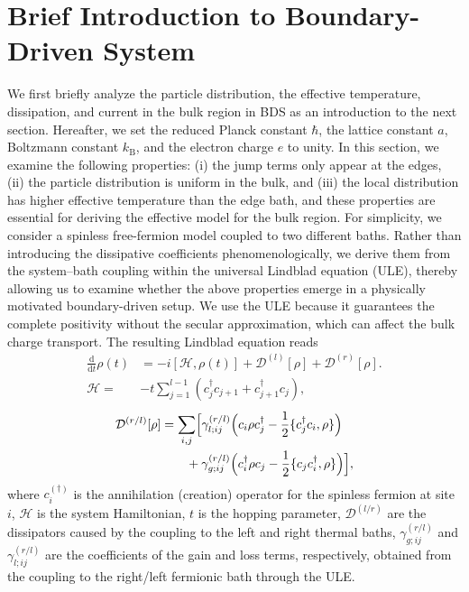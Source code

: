 \documentclass[a4paper, amsfonts, amssymb, amsmath, reprint, showkeys, nofootinbib, twoside,superscriptaddress, prb]{revtex4-2}
\newcommand{\m}[1]{\mathcal{#1}}
\newcommand{\dt}{\frac{\mathrm{d}}{\mathrm{d}t}}
\begin{document}
\section{Brief Introduction to Boundary-Driven System}
We first briefly analyze the particle distribution, the effective temperature, dissipation, and current in the bulk region in BDS as an introduction to the next section. Hereafter, we set the reduced Planck constant $\hbar$, the lattice constant $a$, Boltzmann constant $k_\mathrm{B}$, and the electron charge $e$ to unity. In this section, we examine the following properties: (i) the jump terms only appear at the edges, (ii) the particle distribution is uniform in the bulk, and (iii) the local distribution has higher effective temperature than the edge bath, and these properties are essential for deriving the effective model for the bulk region. 
For simplicity, we consider a spinless free-fermion model coupled to two different baths.
Rather than introducing the dissipative coefficients phenomenologically, we derive them from the system--bath coupling within the universal Lindblad equation (ULE)\cite{Nathan2020-mj,Davidovic2022-zp,Nathan2024-ag,Ikeuchi2025-wd}, thereby allowing us to examine whether the above properties emerge in a physically motivated boundary-driven setup.
We use the ULE because it guarantees the complete positivity without the secular approximation, which can affect the bulk charge transport\cite{Wichterich2007-mg, Landi2022-gk}. The resulting Lindblad equation reads
\begin{align}
    \dt \rho(t) &= -i[\m{H},\rho(t)] + \m{D}^{(l)}[\rho] + \m{D}^{(r)}[\rho].\label{NR}\\
    \m{H} =& -t\sum_{j=1}^{l-1} (c_j^{\dagger} c_{j+1} + c_{j+1}^{\dagger} c_j),\label{Ham_boundary}
\end{align}
\begin{align}
    \m{D}^{(r/l)}[\rho] &= \sum_{i,j} \Bigl[\gamma^{(r/l)}_{l;ij}\Bigl(c_i \rho c_j^{\dagger} - \frac{1}{2}\{c_j^{\dagger}c_i, \rho\}\Bigr)\nonumber\\
    & \ \ \ \ \ \ +\gamma^{(r/l)}_{g;ij}\Bigl(c_i^{\dagger} \rho c_j - \frac{1}{2}\{c_jc_i^{\dagger}, \rho\}\Bigr)\Bigr],\label{dissipator_boundary}
\end{align}
where $c^{(\dagger)}_{i}$ is the annihilation (creation) operator for the spinless fermion at site $i$, $\m{H}$ is the system Hamiltonian, $t$ is the hopping parameter, $\m{D}^{(l/r)}$ are the dissipators caused by the coupling to the left and right thermal baths, $\gamma^{(r/l)}_{g;ij}$ and $\gamma^{(r/l)}_{l;ij}$ are the coefficients of the gain and loss terms, respectively, obtained from the coupling to the right/left fermionic bath through the ULE.
\end{document}
